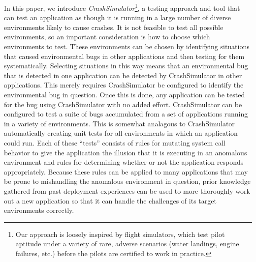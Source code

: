 %
In this paper, we introduce {\em CrashSimulator}\footnote{
Our approach is loosely inspired by flight simulators, which test pilot
aptitude under a variety of rare, adverse scenarios (water landings, 
engine failures, etc.) before the pilots are certified to work in practice.}, 
a testing approach
and tool that can test an application as though it is running in a large number
of diverse environments likely to cause crashes.  It is not 
feasible to test all possible environments, so an important consideration
is how to choose which environments to test.  These environments can be chosen
by  identifying 
situations that caused environmental bugs in other applications and then
testing for them systematically.
Selecting situations in this way means that an environmental bug that is detected in one application can be 
detected by CrashSimulator in other applications. 
This merely requires CrashSimulator be configured to identify the environmental
bug in question.
Once this is done, any application can
be tested for the bug using CrashSimulator with no added effort.  CrashSimulator
can be configured to test a suite of bugs accumulated from a set of applications
running in a variety of environments.
This is somewhat analagous to
CrashSimulator automatically creating unit tests for all environments
in which an application could run.
Each of these ``tests'' consists of rules for
mutating system call behavior to give the application the illusion that it is
executing in an anomalous environment and rules for determining whether or not
the application responds appropriately.
Because these rules can be applied to many
applications that may be prone to mishandling the
anomalous environment in question, prior knowledge
gathered from past deployment experiences can be used to more thoroughly work
out a new application so that it can
handle the challenges of its target environments correctly.

